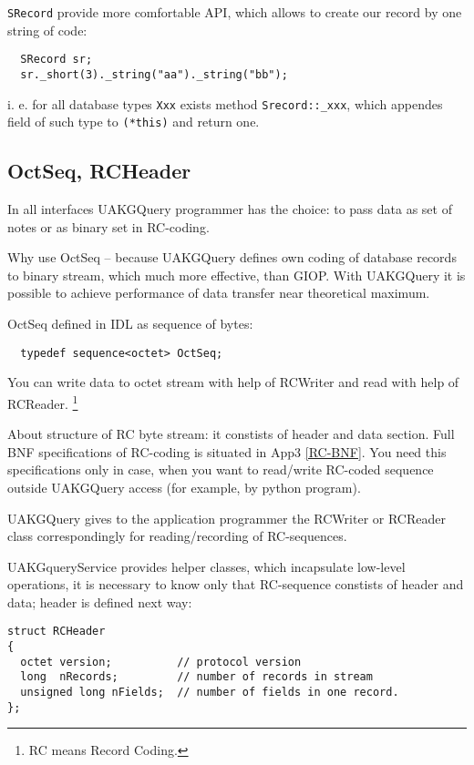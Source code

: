 \documentclass[10pt]{article}
\begin{document}
 \verb|SRecord| provide more comfortable API, which allows to create our record by one string of code:
\begin{verbatim}
  SRecord sr;
  sr._short(3)._string("aa")._string("bb");
\end{verbatim}

 i. e. for all database types \verb|Xxx| exists method  \verb|Srecord::_xxx|,
 which appendes field of such type to \verb|(*this)| and return one.

\subsection{ OctSeq, RCHeader }

In all interfaces UAKGQuery programmer has the choice: to pass data as set of notes or as binary set in RC-coding.
 
 Why use OctSeq -- because UAKGQuery defines own coding of database records to
 binary stream, which much more effective, than GIOP. With UAKGQuery it is
 possible to achieve performance of data transfer near theoretical
 maximum.

OctSeq defined in IDL as sequence of bytes:
\begin{verbatim}
  typedef sequence<octet> OctSeq;
\end{verbatim}


 You can write data to octet stream with help of RCWriter and read
 with help of RCReader. 
 \footnote{RC means Record Coding. }

 About structure of RC byte stream: it constists of header and data section.
 Full BNF specifications of RC-coding is situated in App3 \ref{RC-BNF}.
 You need this specifications only in case, when you want to read/write
 RC-coded sequence outside UAKGQuery access (for example, by python program).

UAKGQuery gives to the application programmer the RCWriter or RCReader class correspondingly for reading/recording of RC-sequences.

 UAKGqueryService provides helper classes, which incapsulate low-level operations, it is necessary to know only that RC-sequence constists of header and data;
 header is defined next way:
\begin{verbatim}
struct RCHeader
{
  octet version;          // protocol version
  long  nRecords;         // number of records in stream
  unsigned long nFields;  // number of fields in one record.
};
\end{verbatim}
\end{document}
